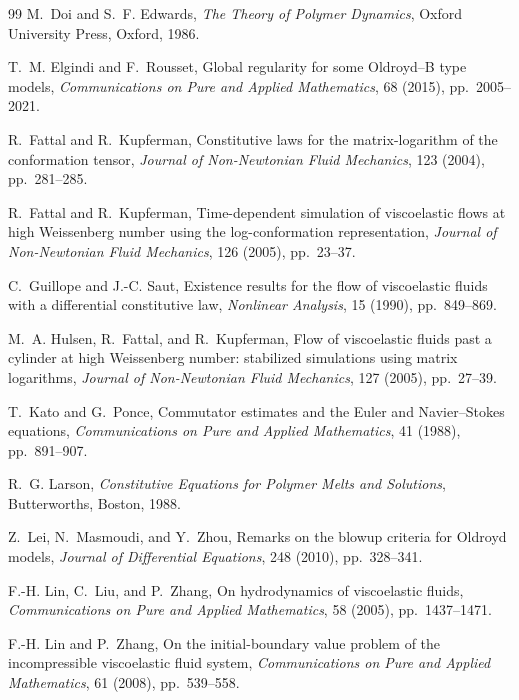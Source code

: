 \documentclass[11pt]{article}
\begin{document}
\begin{thebibliography}{99}
M.~Doi and S.~F. Edwards,
\newblock \emph{The Theory of Polymer Dynamics},
\newblock Oxford University Press, Oxford, 1986.

T.~M. Elgindi and F.~Rousset,
\newblock Global regularity for some Oldroyd--B type models,
\newblock \emph{Communications on Pure and Applied Mathematics}, 68 (2015),
pp.~2005--2021.

R.~Fattal and R.~Kupferman,
\newblock Constitutive laws for the matrix-logarithm of the conformation tensor,
\newblock \emph{Journal of Non-Newtonian Fluid Mechanics}, 123 (2004),
pp.~281--285.

R.~Fattal and R.~Kupferman,
\newblock Time-dependent simulation of viscoelastic flows at high Weissenberg
number using the log-conformation representation,
\newblock \emph{Journal of Non-Newtonian Fluid Mechanics}, 126 (2005),
pp.~23--37.

C.~Guillope and J.-C. Saut,
\newblock Existence results for the flow of viscoelastic fluids with a
differential constitutive law,
\newblock \emph{Nonlinear Analysis}, 15 (1990), pp.~849--869.

M.~A. Hulsen, R.~Fattal, and R.~Kupferman,
\newblock Flow of viscoelastic fluids past a cylinder at high Weissenberg number:
stabilized simulations using matrix logarithms,
\newblock \emph{Journal of Non-Newtonian Fluid Mechanics}, 127 (2005),
pp.~27--39.

T.~Kato and G.~Ponce,
\newblock Commutator estimates and the Euler and Navier--Stokes equations,
\newblock \emph{Communications on Pure and Applied Mathematics}, 41 (1988),
pp.~891--907.

R.~G. Larson,
\newblock \emph{Constitutive Equations for Polymer Melts and Solutions},
\newblock Butterworths, Boston, 1988.

Z.~Lei, N.~Masmoudi, and Y.~Zhou,
\newblock Remarks on the blowup criteria for Oldroyd models,
\newblock \emph{Journal of Differential Equations}, 248 (2010), pp.~328--341.

F.-H. Lin, C.~Liu, and P.~Zhang,
\newblock On hydrodynamics of viscoelastic fluids,
\newblock \emph{Communications on Pure and Applied Mathematics}, 58 (2005),
pp.~1437--1471.

F.-H. Lin and P.~Zhang,
\newblock On the initial-boundary value problem of the incompressible
viscoelastic fluid system,
\newblock \emph{Communications on Pure and Applied Mathematics}, 61 (2008),
pp.~539--558.


\end{thebibliography}
\end{document}
